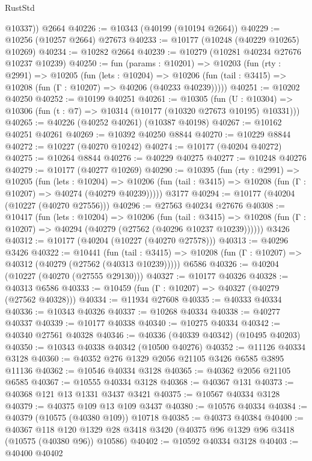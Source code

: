 \begin{lexlean}{RustStd}
\begin{coremodule}
        @10337))
    @2664
@40226 := @10343 (@40199 (@10194 @2664))
@40229 := @10256 (@10257 @2664) @27673
@40233 := @10177 (@10248 (@40229 @10265) @10269)
@40234 := @10282 @2664
@40239 := @10279 (@10281 @40234 @27676 @10237 @10239)
@40250 := fun (params : @10201) =>
  @10203
    (fun (rty : @2991) =>
    @10205
      (fun (lets : @10204) =>
      @10206 (fun (tail : @3415) => @10208 (fun (Γ : @10207) => @40206 (@40233 @40239)))))
@40251 := @10202 @40250
@40252 := @10199 @40251
@40261 := @10305
    (fun (U : @10304) => @10306 (fun (t : @7) => @10314 (@10177 (@10320 @27673 @10195) @10331)))
@40265 := @40226 (@40252 @40261) (@10387 @40198)
@40267 := @10162 @40251 @40261
@40269 := @10392 @40250 @8844
@40270 := @10229 @8844
@40272 := @10227 (@40270 @10242)
@40274 := @10177 (@40204 @40272)
@40275 := @10264 @8844
@40276 := @40229 @40275
@40277 := @10248 @40276
@40279 := @10177 (@40277 @10269)
@40290 := @10395
    (fun (rty : @2991) =>
    @10205
      (fun (lets : @10204) =>
      @10206 (fun (tail : @3415) => @10208 (fun (Γ : @10207) => @40274 (@40279 @40239)))))
    @3177
@40294 := @10177 (@40204 (@10227 (@40270 @27556)))
@40296 := @27563 @40234 @27676
@40308 := @10417
    (fun (lets : @10204) =>
    @10206
      (fun (tail : @3415) =>
      @10208 (fun (Γ : @10207) => @40294 (@40279 (@27562 (@40296 @10237 @10239))))))
    @3426
@40312 := @10177 (@40204 (@10227 (@40270 @27578)))
@40313 := @40296 @3426
@40322 := @10441
    (fun (tail : @3415) => @10208 (fun (Γ : @10207) => @40312 (@40279 (@27562 (@40313 @10239)))))
    @6586
@40326 := @40204 (@10227 (@40270 (@27555 @29130)))
@40327 := @10177 @40326
@40328 := @40313 @6586
@40333 := @10459 (fun (Γ : @10207) => @40327 (@40279 (@27562 @40328)))
@40334 := @11934 @27608
@40335 := @40333 @40334
@40336 := @10343 @40326
@40337 := @10268 @40334
@40338 := @40277 @40337
@40339 := @10177 @40338
@40340 := @10275 @40334
@40342 := @40340 @27561 @40328
@40346 := @40336 (@40339 @40342) (@10495 @40203)
@40350 := @10343 @40338 @40342 (@10500 @40276)
@40352 := @11126 @40334 @3128
@40360 := @40352 @276 @1329 @2056 @21105 @3426 @6585 @3895 @11136
@40362 := @10546 @40334 @3128
@40365 := @40362 @2056 @21105 @6585
@40367 := @10555 @40334 @3128
@40368 := @40367 @131
@40373 := @40368 @121 @13 @1331 @3437 @3421
@40375 := @10567 @40334 @3128
@40379 := @40375 @109 @13 @109 @3437
@40380 := @10576 @40334
@40384 := @40379 (@10575 (@40380 @109)) @10718
@40385 := @40373 @40384
@40400 := @40367
    @118
    @120
    @1329
    @28
    @3418
    @3420
    (@40375 @96 @1329 @96 @3418 (@10575 (@40380 @96)) @10586)
@40402 := @10592 @40334 @3128
@40403 := @40400 @40402

\end{coremodule}
\end{lexlean}
